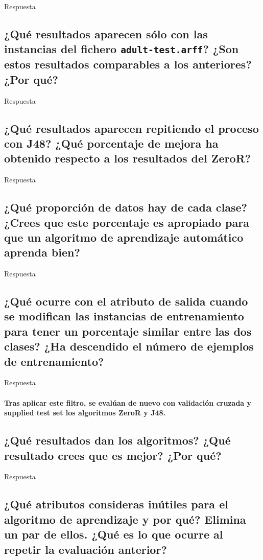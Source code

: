\documentclass[12pt]{article}
\begin{document}
Respuesta

\subsection*{\small ¿Qué resultados aparecen sólo con las instancias del fichero
\texttt{adult-test.arff}? ¿Son estos resultados comparables a los anteriores?
¿Por qué?}

Respuesta

\subsection*{\small ¿Qué resultados aparecen repitiendo el proceso con J48?
¿Qué porcentaje de mejora ha obtenido respecto a los resultados del ZeroR?}

Respuesta

\subsection*{\small ¿Qué proporción de datos hay de cada clase? ¿Crees que este
porcentaje es apropiado para que un algoritmo de aprendizaje automático aprenda
bien?}

Respuesta

\subsection*{\small ¿Qué ocurre con el atributo de salida cuando se modifican
las instancias de entrenamiento para tener un porcentaje similar entre las dos
clases? ¿Ha descendido el número de ejemplos de entrenamiento?}

Respuesta

\paragraph{\small Tras aplicar este filtro, se evalúan de nuevo con validación
cruzada y supplied test set los algoritmos ZeroR y J48.}

\subsection*{\small ¿Qué resultados dan los algoritmos? ¿Qué resultado crees que
es mejor? ¿Por qué?}

Respuesta

\subsection*{\small ¿Qué atributos consideras inútiles para el algoritmo de
aprendizaje y por qué? Elimina un par de ellos. ¿Qué es lo que ocurre al
repetir la evaluación anterior?}
\end{document}
